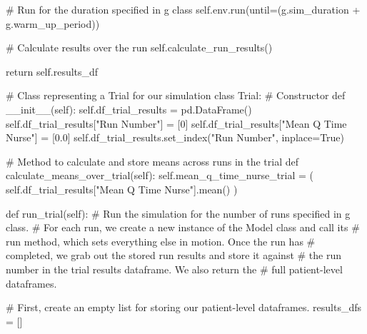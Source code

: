 \documentclass[
  letterpaper,
  DIV=11,
  numbers=noendperiod]{scrreprt}
\newenvironment{Shaded}{\begin{snugshade}}{\end{snugshade}}
\newcommand{\CommentTok}[1]{\textcolor[rgb]{0.37,0.37,0.37}{#1}}
\newcommand{\ControlFlowTok}[1]{\textcolor[rgb]{0.00,0.23,0.31}{#1}}
\newcommand{\DecValTok}[1]{\textcolor[rgb]{0.68,0.00,0.00}{#1}}
\newcommand{\FloatTok}[1]{\textcolor[rgb]{0.68,0.00,0.00}{#1}}
\newcommand{\FunctionTok}[1]{\textcolor[rgb]{0.28,0.35,0.67}{#1}}
\newcommand{\KeywordTok}[1]{\textcolor[rgb]{0.00,0.23,0.31}{#1}}
\newcommand{\NormalTok}[1]{\textcolor[rgb]{0.00,0.23,0.31}{#1}}
\newcommand{\OperatorTok}[1]{\textcolor[rgb]{0.37,0.37,0.37}{#1}}
\newcommand{\StringTok}[1]{\textcolor[rgb]{0.13,0.47,0.30}{#1}}
\newcommand{\VariableTok}[1]{\textcolor[rgb]{0.07,0.07,0.07}{#1}}
\begin{document}
\begin{Shaded}
\begin{Highlighting}[]
        \CommentTok{\# Run for the duration specified in g class}
        \VariableTok{self}\NormalTok{.env.run(until}\OperatorTok{=}\NormalTok{(g.sim\_duration }\OperatorTok{+}\NormalTok{ g.warm\_up\_period))}

        \CommentTok{\# Calculate results over the run}
        \VariableTok{self}\NormalTok{.calculate\_run\_results()}

        \ControlFlowTok{return} \VariableTok{self}\NormalTok{.results\_df}

\CommentTok{\# Class representing a Trial for our simulation}
\KeywordTok{class}\NormalTok{ Trial:}
    \CommentTok{\# Constructor}
    \KeywordTok{def}  \FunctionTok{\_\_init\_\_}\NormalTok{(}\VariableTok{self}\NormalTok{):}
        \VariableTok{self}\NormalTok{.df\_trial\_results }\OperatorTok{=}\NormalTok{ pd.DataFrame()}
        \VariableTok{self}\NormalTok{.df\_trial\_results[}\StringTok{"Run Number"}\NormalTok{] }\OperatorTok{=}\NormalTok{ [}\DecValTok{0}\NormalTok{]}
        \VariableTok{self}\NormalTok{.df\_trial\_results[}\StringTok{"Mean Q Time Nurse"}\NormalTok{] }\OperatorTok{=}\NormalTok{ [}\FloatTok{0.0}\NormalTok{]}
        \VariableTok{self}\NormalTok{.df\_trial\_results.set\_index(}\StringTok{"Run Number"}\NormalTok{, inplace}\OperatorTok{=}\VariableTok{True}\NormalTok{)}

    \CommentTok{\# Method to calculate and store means across runs in the trial}
    \KeywordTok{def}\NormalTok{ calculate\_means\_over\_trial(}\VariableTok{self}\NormalTok{):}
        \VariableTok{self}\NormalTok{.mean\_q\_time\_nurse\_trial }\OperatorTok{=}\NormalTok{ (}
            \VariableTok{self}\NormalTok{.df\_trial\_results[}\StringTok{"Mean Q Time Nurse"}\NormalTok{].mean()}
\NormalTok{        )}

    \KeywordTok{def}\NormalTok{ run\_trial(}\VariableTok{self}\NormalTok{):}
        \CommentTok{\# Run the simulation for the number of runs specified in g class.}
        \CommentTok{\# For each run, we create a new instance of the Model class and call its}
        \CommentTok{\# run method, which sets everything else in motion.  Once the run has}
        \CommentTok{\# completed, we grab out the stored run results and store it against}
        \CommentTok{\# the run number in the trial results dataframe. We also return the}
        \CommentTok{\# full patient{-}level dataframes.}

        \CommentTok{\# First, create an empty list for storing our patient{-}level dataframes.}
\NormalTok{        results\_dfs }\OperatorTok{=}\NormalTok{ []}


\end{Highlighting}
\end{Shaded}
\end{document}
